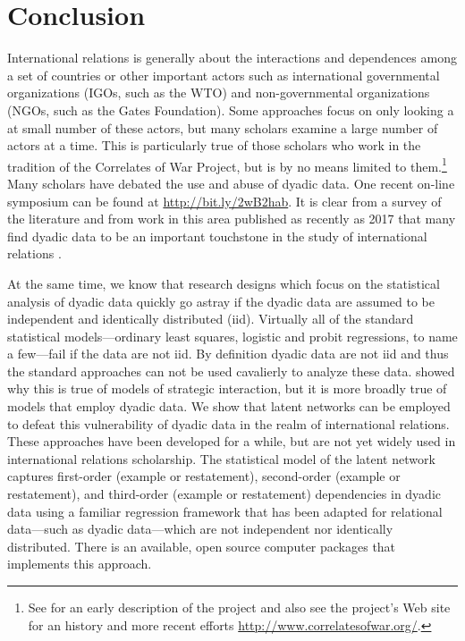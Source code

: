 \section{Conclusion}

International relations is generally about the interactions and dependences among a set of countries or other important actors such as international governmental organizations (IGOs, such as the WTO) and non-governmental organizations (NGOs, such as the Gates Foundation).  Some approaches focus on only looking a at small number of these actors, but many scholars examine a large number of actors at a time. This is particularly true of those scholars who work in the tradition of the Correlates of War Project, but is by no means limited to them.\footnote{See \cite{singer:1972} for an early description of the project and also see the project's Web site for an history and more recent efforts \url{http://www.correlatesofwar.org/}.} Many scholars have debated the use and abuse of dyadic data. One recent on-line symposium can be found at \url{http://bit.ly/2wB2hab}. It is clear from a survey of the literature and from work in this area published as recently as 2017 that many find dyadic data to be an important touchstone in the study of international relations \citet{erikson:pinto:2014,aronow:etal:2015}.

At the same time, we know that research designs which focus on the statistical analysis of dyadic data quickly go astray if the dyadic data are assumed to be independent and identically distributed (iid).  Virtually all of the standard statistical models---ordinary least squares, logistic and probit regressions, to name a few---fail if the data are not iid. By definition dyadic data are not iid and thus the standard approaches can not be used cavalierly to analyze these data.  \citet{signorino:1999} showed why this is true of models of strategic interaction, but it is more broadly true of models that employ dyadic data.  We show that latent networks can be employed to defeat this vulnerability of dyadic data in the realm of international relations. These approaches have been developed for a while, but are not yet widely used in international relations scholarship.  The statistical model of the latent network captures first-order (example or restatement), second-order (example or restatement), and third-order (example or restatement) dependencies in dyadic data using a familiar regression framework that has been adapted for relational data---such as dyadic data---which are not independent nor identically distributed. There is an available, open source computer packages that implements this approach.

